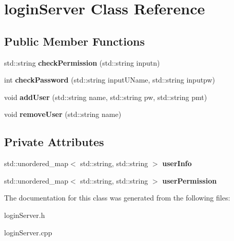 \hypertarget{classloginServer}{}\section{login\+Server Class Reference}
\label{classloginServer}
\subsection*{Public Member Functions}
\begin{DoxyCompactItemize}
\item 
\mbox{\label{classloginServer_a80b4ed3f6226e7de08ce3e47776fd38e}} 
std\+::string {\bfseries check\+Permission} (std\+::string inputn)
\item 
\mbox{\label{classloginServer_abcdf9983f02c5926ef2d31cac7ef3b23}} 
int {\bfseries check\+Password} (std\+::string input\+U\+Name, std\+::string inputpw)
\item 
\mbox{\label{classloginServer_a77dbee3c235f8c98936c2b7c5d223af0}} 
void {\bfseries add\+User} (std\+::string name, std\+::string pw, std\+::string pmt)
\item 
\mbox{\label{classloginServer_a0f13e36783e7b8dcfc41b5fa651d9743}} 
void {\bfseries remove\+User} (std\+::string name)
\end{DoxyCompactItemize}
\subsection*{Private Attributes}
\begin{DoxyCompactItemize}
\item 
\mbox{\label{classloginServer_abd49dfb28a747822f9078a246f6c1231}} 
std\+::unordered\+\_\+map$<$ std\+::string, std\+::string $>$ {\bfseries user\+Info}
\item 
\mbox{\label{classloginServer_a47784c2e7b530a6e19b70c5c6ba06108}} 
std\+::unordered\+\_\+map$<$ std\+::string, std\+::string $>$ {\bfseries user\+Permission}
\end{DoxyCompactItemize}


The documentation for this class was generated from the following files\+:\begin{DoxyCompactItemize}
\item 
login\+Server.\+h\item 
login\+Server.\+cpp\end{DoxyCompactItemize}
